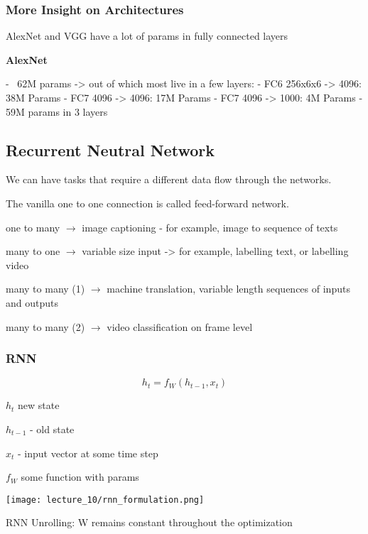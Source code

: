 \subsubsection{More Insight on Architectures }

AlexNet and VGG have a lot of params in fully connected layers

\textbf{AlexNet}

- ~62M params -> out of which most live in a few layers:
  -  FC6 256x6x6 -> 4096: 38M Params
  - FC7 4096 -> 4096: 17M Params
  - FC7 4096 -> 1000: 4M Params
  - 59M params in 3 layers

\subsection{Recurrent Neutral Network }


We can have tasks that require a different data flow through the networks. 

The vanilla one to one connection is called  feed-forward network. 

one to many $\rightarrow$ image captioning - for example, image to sequence of texts

many to one $\rightarrow$ variable size input -> for example, labelling text, or labelling video

many to many (1) $\rightarrow$ machine translation, variable length sequences of inputs and outputs

many to many (2) $\rightarrow$ video classification on frame level

\subsubsection{RNN}


$$h_t = f_W(h_{t-1},x_t) $$

$h_t$ new state

$h_{t-1}$ - old state

$x_t$ -  input vector at some time step

$f_W$ some function with params

\texttt{[image: lecture\_10/rnn\_formulation.png]}

RNN Unrolling: W remains constant throughout the optimization

